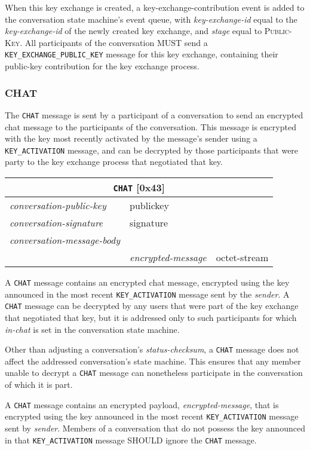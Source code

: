 \documentclass{article}
\def\npmessage#1{\texttt{#1}}
\def\field#1{\textit{#1}}
\def\smfield#1{\textsl{#1}}
\def\type#1{\textsf{#1}}
\newenvironment{conversationmessage}[2]{
\newcommand{\messagefield}[2]{
& \field{##1} & \type{##2} \\
\hline
}
\hspace{2em minus 2em}\begin{tabular}{|l|l|l|}
\hline
\multicolumn{3}{|c|}{\npmessage{#1} [#2]} \\
\hline
\hline
\field{conversation-public-key} & \multicolumn{2}{l|}{\type{publickey}} \\
\hline
\field{conversation-signature} & \multicolumn{2}{l|}{\type{signature}} \\
\hline
\field{conversation-message-body} & \multicolumn{2}{l|}{} \\
\hline
}{
\end{tabular}
}
\begin{document}
When this key exchange is created, a \type{key-exchange-contribution} event is added to the conversation state machine's event queue, with \smfield{key-exchange-id} equal to the \smfield{key-exchange-id} of the newly created key exchange, and \smfield{stage} equal to \textsc{Public-Key}.
All participants of the conversation MUST send a \npmessage{KEY\_EXCHANGE\_PUBLIC\_KEY} message for this key exchange, containing their public-key contribution for the key exchange process.


\subsubsection{CHAT}
\label{sec:messages/chat}

The \npmessage{CHAT} message is sent by a participant of a conversation to send an encrypted chat message to the participants of the conversation.
This message is encrypted with the key most recently activated by the message's sender using a \npmessage{KEY\_ACTIVATION} message, and can be decrypted by those participants that were party to the key exchange process that negotiated that key.

\begin{conversationmessage}{CHAT}{0x43}
\messagefield{encrypted-message}{octet-stream}
\end{conversationmessage}

A \npmessage{CHAT} message contains an encrypted chat message, encrypted using the key announced in the most recent \npmessage{KEY\_ACTIVATION} message sent by the \field{sender}.
A \npmessage{CHAT} message can be decrypted by any users that were part of the key exchange that negotiated that key, but it is addressed only to such participants for which \smfield{in-chat} is set in the conversation state machine.

Other than adjusting a conversation's \smfield{status-checksum}, a \npmessage{CHAT} message does not affect the addressed conversation's state machine.
This ensures that any member unable to decrypt a \npmessage{CHAT} message can nonetheless participate in the conversation of which it is part.

A \npmessage{CHAT} message contains an encrypted payload, \field{encrypted-message}, that is encrypted using the key announced in the most recent \npmessage{KEY\_ACTIVATION} message sent by \field{sender}.
Members of a conversation that do not possess the key announced in that \npmessage{KEY\_ACTIVATION} message SHOULD ignore the \npmessage{CHAT} message.
\end{document}
